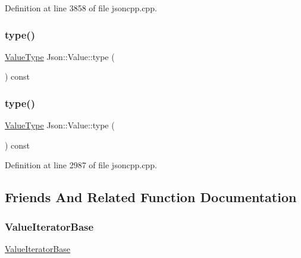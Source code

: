 Definition at line 3858 of file jsoncpp.\+cpp.

\hypertarget{class_json_1_1_value_a8ce61157a011894f0252ceed232312de}{}\label{class_json_1_1_value_a8ce61157a011894f0252ceed232312de} 
\subsubsection{\texorpdfstring{type()}{type()}\hspace{0.1cm}{\footnotesize\ttfamily [1/2]}}
{\footnotesize\ttfamily \hyperlink{namespace_json_a7d654b75c16a57007925868e38212b4e}{Value\+Type} Json\+::\+Value\+::type (\begin{DoxyParamCaption}{ }\end{DoxyParamCaption}) const}

\hypertarget{class_json_1_1_value_a8ce61157a011894f0252ceed232312de}{}\label{class_json_1_1_value_a8ce61157a011894f0252ceed232312de} 
\subsubsection{\texorpdfstring{type()}{type()}\hspace{0.1cm}{\footnotesize\ttfamily [2/2]}}
{\footnotesize\ttfamily \hyperlink{namespace_json_a7d654b75c16a57007925868e38212b4e}{Value\+Type} Json\+::\+Value\+::type (\begin{DoxyParamCaption}{ }\end{DoxyParamCaption}) const}



Definition at line 2987 of file jsoncpp.\+cpp.



\subsection{Friends And Related Function Documentation}
\hypertarget{class_json_1_1_value_a6bd095e101a936fb8db492964a15263d}{}\label{class_json_1_1_value_a6bd095e101a936fb8db492964a15263d} 
\subsubsection{\texorpdfstring{Value\+Iterator\+Base}{ValueIteratorBase}}
{\footnotesize\ttfamily \hyperlink{class_json_1_1_value_iterator_base}{Value\+Iterator\+Base}\hspace{0.3cm}{\ttfamily [friend]}}



